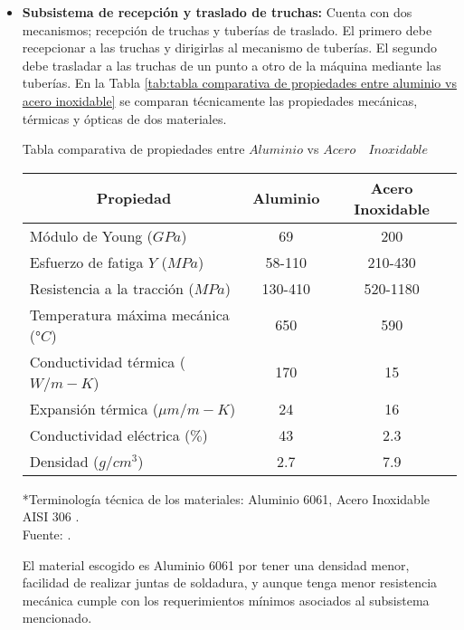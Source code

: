 \begin{itemize}
	\item \textbf{Subsistema de recepción y traslado de truchas:} Cuenta con dos mecanismos; recepción de truchas y tuberías de traslado. El primero debe recepcionar a las truchas y dirigirlas al mecanismo de tuberías. El segundo debe trasladar a las truchas de un punto a otro de la máquina mediante las tuberías. En la Tabla \ref{tab:tabla comparativa de propiedades entre aluminio vs acero inoxidable} se comparan técnicamente las propiedades mecánicas, térmicas y ópticas de dos materiales.
	
	\begin{mytable}[H]
		\footnotesize\centering
		\caption{Tabla comparativa de propiedades entre $Aluminio$ vs $Acero \quad Inoxidable$}
		\label{tab:tabla comparativa de propiedades entre aluminio vs acero inoxidable}
		\begin{tabular}{|l|c|c|}
			\hline
			\multicolumn{1}{|c|}{\textbf{Propiedad}} & \textbf{Aluminio} & \textbf{Acero Inoxidable} \\ \hline
			Módulo de Young ($GPa$) & 69 & 200 \\ \hline
			Esfuerzo de fatiga $Y$ ($MPa$) & 58-110 & 210-430 \\ \hline
			Resistencia a la tracción ($MPa$) & 130-410 & 520-1180 \\ \hline
			Temperatura máxima mecánica (°$C$) & 650 & 590 \\ \hline
			Conductividad térmica ($W/m-K$) & 170 & 15 \\ \hline
			Expansión térmica (${\mu}m/m-K$) & 24 & 16 \\ \hline
			Conductividad eléctrica ($\%$) & 43 & 2.3 \\ \hline
			Densidad ($g/cm^3$) & 2.7 & 7.9 \\ \hline
		\end{tabular}
		\begin{myflushcenteraftertable}
			*Terminología técnica de los materiales: Aluminio 6061, Acero Inoxidable AISI 306 .\\		
			Fuente: \cite{MakeItFrom2020}.
		\end{myflushcenteraftertable}
	\end{mytable}

	El material escogido es Aluminio 6061 por tener una densidad menor, facilidad de realizar juntas de soldadura, y aunque tenga menor resistencia mecánica cumple con los requerimientos mínimos asociados al subsistema mencionado.
	

\end{itemize}
